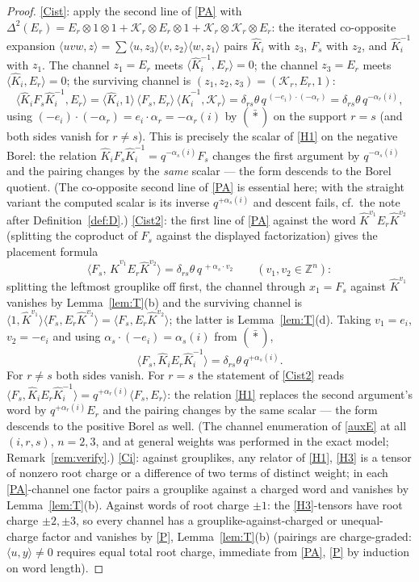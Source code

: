 \documentclass[11pt]{article}
\theoremstyle{definition}
\theoremstyle{remark}
\newcommand{\la}{\langle}
\newcommand{\ra}{\rangle}
\newcommand{\Z}{\mathbb{Z}}
\newcommand{\del}{\delta}
\newcommand{\hK}{\hat K}
\newcommand{\cK}{\mathcal K}
\newcommand{\tht}{\theta}
\begin{document}
\begin{proof}
\eqref{Cist}: apply the second line of \eqref{PA} with
$\Delta^2(E_r)=E_r\otimes1\otimes1+\cK_r\otimes E_r\otimes1
+\cK_r\otimes\cK_r\otimes E_r$: the iterated co-opposite expansion
$\la uvw,z\ra=\sum\la u,z_3\ra\la v,z_2\ra\la w,z_1\ra$ pairs
$\hK_i$ with $z_3$, $F_s$ with $z_2$, and $\hK_i^{-1}$ with $z_1$.
The channel $z_1=E_r$ meets $\la\hK_i^{-1},E_r\ra=0$; the channel
$z_3=E_r$ meets $\la\hK_i,E_r\ra=0$; the surviving channel is
$(z_1,z_2,z_3)=(\cK_r,E_r,1)$:
\[
\la\hK_iF_s\hK_i^{-1},E_r\ra
=\la\hK_i,1\ra\,\la F_s,E_r\ra\,\la\hK_i^{-1},\cK_r\ra
=\del_{rs}\tht\,q^{\,(-e_i)\cdot(-\alpha_r)}
=\del_{rs}\tht\,q^{-\alpha_r(i)},
\]
using $(-e_i)\cdot(-\alpha_r)=e_i\cdot\alpha_r=-\alpha_r(i)$ by
$(\bar\ast)$ on the support $r=s$ (and both sides vanish for
$r\neq s$).  This is precisely the scalar of \eqref{H1} on the
negative Borel: the relation
$\hK_iF_s\hK_i^{-1}=q^{-\alpha_s(i)}F_s$ changes the first argument
by $q^{-\alpha_s(i)}$ and the pairing changes by the
\emph{same} scalar — the form descends to the Borel quotient.
(The co-opposite second line of \eqref{PA} is essential here; with
the straight variant the computed scalar is its inverse
$q^{+\alpha_s(i)}$ and descent fails, cf.\ the note after
Definition~\ref{def:D}.)
\eqref{Cist2}: the first line of \eqref{PA} against the word
$\hK^{v_1}E_r\hK^{v_2}$ (splitting the coproduct of $F_s$ against
the displayed factorization) gives the placement
formula
\begin{equation}
\la F_s,\,\hK^{v_1}E_r\hK^{v_2}\ra
=\del_{rs}\tht\,q^{\,+\alpha_s\cdot v_2}
\qquad(v_1,v_2\in\Z^n):\label{auxE}\tag{$\dagger$}
\end{equation}
splitting the leftmost grouplike off first, the channel through
$x_1=F_s$ against $\hK^{v_1}$ vanishes by Lemma~\ref{lem:T}(b) and the
surviving channel is
$\la1,\hK^{v_1}\ra\la F_s,E_r\hK^{v_2}\ra
=\la F_s,E_r\hK^{v_2}\ra$; the latter is Lemma~\ref{lem:T}(d).
Taking $v_1=e_i$, $v_2=-e_i$ and using
$\alpha_s\cdot(-e_i)=\alpha_s(i)$ from $(\bar\ast)$,
\[
\la F_s,\hK_iE_r\hK_i^{-1}\ra
=\del_{rs}\tht\,q^{+\alpha_s(i)} .
\]
For $r\neq s$ both sides vanish.  For $r=s$ the statement of
\eqref{Cist2} reads $\la F_s,\hK_iE_r\hK_i^{-1}\ra
=q^{+\alpha_r(i)}\la F_s,E_r\ra$: the relation \eqref{H1} replaces
the second argument's word by $q^{+\alpha_r(i)}E_r$ and the pairing
changes by the same scalar — the form descends to the positive Borel
as well.  (The channel enumeration of
\eqref{auxE} at all $(i,r,s)$, $n=2,3$, and at general weights was
performed in the exact model; Remark~\ref{rem:verify}.)
\eqref{Ci}: against grouplikes, any relator of \eqref{H1},
\eqref{H3} is a tensor of nonzero root charge or a difference of two
terms of distinct weight; in each \eqref{PA}-channel one factor
pairs a grouplike against a charged word and vanishes by
Lemma~\ref{lem:T}(b).  Against words of root charge $\pm1$: the
\eqref{H3}-tensors have root charge $\pm2,\pm3$, so every channel
has a grouplike-against-charged or unequal-charge factor and
vanishes by \eqref{P}, Lemma~\ref{lem:T}(b) (pairings are
charge-graded: $\la u,y\ra\neq0$ requires equal total root charge,
immediate from \eqref{PA}, \eqref{P} by induction on word length).
\end{proof}
\end{document}
